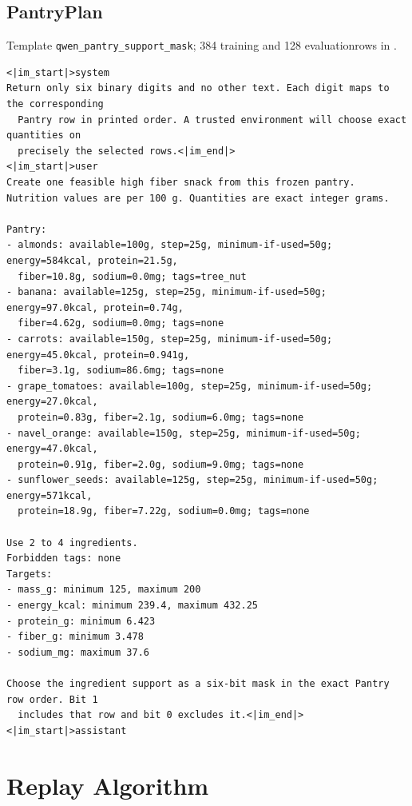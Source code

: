 \documentclass{article}
\newcommand{\1}{\mathbf 1}
\theoremstyle{remark}
\theoremstyle{definition}
\theoremstyle{plain}
\begin{document}
\subsection{PantryPlan}
\label{app:prompt-pantry}

\noindent Template \texttt{qwen\_pantry\_support\_mask}; 384 training and 128 evaluation\linebreak rows in .

\begin{Verbatim}[fontsize=\scriptsize,frame=single,framesep=4pt,rulecolor=\color{black!25}]
<|im_start|>system
Return only six binary digits and no other text. Each digit maps to the corresponding
  Pantry row in printed order. A trusted environment will choose exact quantities on
  precisely the selected rows.<|im_end|>
<|im_start|>user
Create one feasible high fiber snack from this frozen pantry.
Nutrition values are per 100 g. Quantities are exact integer grams.

Pantry:
- almonds: available=100g, step=25g, minimum-if-used=50g; energy=584kcal, protein=21.5g,
  fiber=10.8g, sodium=0.0mg; tags=tree_nut
- banana: available=125g, step=25g, minimum-if-used=50g; energy=97.0kcal, protein=0.74g,
  fiber=4.62g, sodium=0.0mg; tags=none
- carrots: available=150g, step=25g, minimum-if-used=50g; energy=45.0kcal, protein=0.941g,
  fiber=3.1g, sodium=86.6mg; tags=none
- grape_tomatoes: available=100g, step=25g, minimum-if-used=50g; energy=27.0kcal,
  protein=0.83g, fiber=2.1g, sodium=6.0mg; tags=none
- navel_orange: available=150g, step=25g, minimum-if-used=50g; energy=47.0kcal,
  protein=0.91g, fiber=2.0g, sodium=9.0mg; tags=none
- sunflower_seeds: available=125g, step=25g, minimum-if-used=50g; energy=571kcal,
  protein=18.9g, fiber=7.22g, sodium=0.0mg; tags=none

Use 2 to 4 ingredients.
Forbidden tags: none
Targets:
- mass_g: minimum 125, maximum 200
- energy_kcal: minimum 239.4, maximum 432.25
- protein_g: minimum 6.423
- fiber_g: minimum 3.478
- sodium_mg: maximum 37.6

Choose the ingredient support as a six-bit mask in the exact Pantry row order. Bit 1
  includes that row and bit 0 excludes it.<|im_end|>
<|im_start|>assistant
\end{Verbatim}



\section{Replay Algorithm}
\label{app:algorithm}
\label{app:replay-objective}
\end{document}
